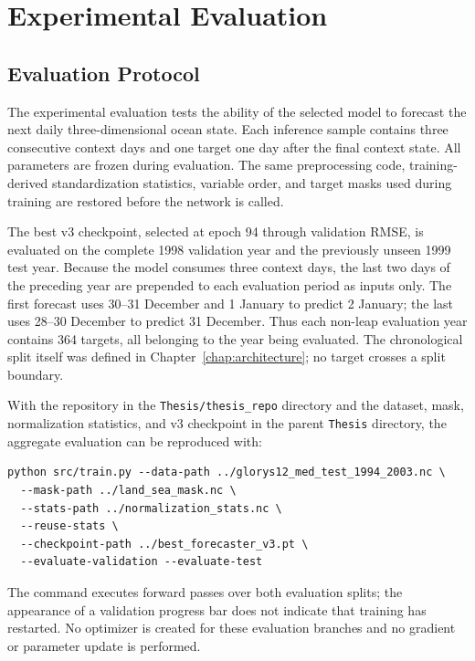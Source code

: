 \chapter{Experimental Evaluation}
\label{chap:evaluation}

\section{Evaluation Protocol}

The experimental evaluation tests the ability of the selected model to forecast the next daily three-dimensional ocean state. Each inference sample contains three consecutive context days and one target one day after the final context state. All parameters are frozen during evaluation. The same preprocessing code, training-derived standardization statistics, variable order, and target masks used during training are restored before the network is called.

The best v3 checkpoint, selected at epoch 94 through validation RMSE, is evaluated on the complete 1998 validation year and the previously unseen 1999 test year. Because the model consumes three context days, the last two days of the preceding year are prepended to each evaluation period as inputs only. The first forecast uses 30--31 December and 1 January to predict 2 January; the last uses 28--30 December to predict 31 December. Thus each non-leap evaluation year contains 364 targets, all belonging to the year being evaluated. The chronological split itself was defined in Chapter~\ref{chap:architecture}; no target crosses a split boundary.

With the repository in the \texttt{Thesis/thesis\_repo} directory and the dataset, mask, normalization statistics, and v3 checkpoint in the parent \texttt{Thesis} directory, the aggregate evaluation can be reproduced with:

\begin{lstlisting}[caption={Inference commands for the selected checkpoint.}]
python src/train.py --data-path ../glorys12_med_test_1994_2003.nc \
  --mask-path ../land_sea_mask.nc \
  --stats-path ../normalization_stats.nc \
  --reuse-stats \
  --checkpoint-path ../best_forecaster_v3.pt \
  --evaluate-validation --evaluate-test
\end{lstlisting}

The command executes forward passes over both evaluation splits; the appearance of a validation progress bar does not indicate that training has restarted. No optimizer is created for these evaluation branches and no gradient or parameter update is performed.


